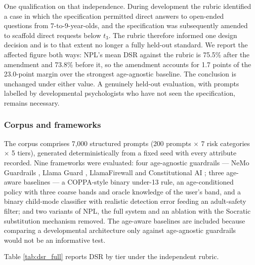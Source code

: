 \documentclass[fleqn,10pt]{wlscirep}
\begin{document}
One qualification on that independence. During development the rubric identified a case in which the specification permitted direct answers to open-ended questions from 7-to-9-year-olds, and the specification was subsequently amended to scaffold direct requests below $t_3$. The rubric therefore informed one design decision and is to that extent no longer a fully held-out standard. We report the affected figure both ways: NPL's mean DSR against the rubric is 75.5\% after the amendment and 73.8\% before it, so the amendment accounts for 1.7 points of the 23.0-point margin over the strongest age-agnostic baseline. The conclusion is unchanged under either value. A genuinely held-out evaluation, with prompts labelled by developmental psychologists who have not seen the specification, remains necessary.

\subsubsection*{Corpus and frameworks}

The corpus comprises 7,000 structured prompts (200 prompts $\times$ 7 risk categories $\times$ 5 tiers), generated deterministically from a fixed seed with every attribute recorded. Nine frameworks were evaluated: four age-agnostic guardrails --- NeMo Guardrails \cite{Rebedea2023}, Llama Guard \cite{Inan2023}, LlamaFirewall \cite{MetaAI2025} and Constitutional AI \cite{Bai2022}; three age-aware baselines --- a COPPA-style binary under-13 rule, an age-conditioned policy with three coarse bands and oracle knowledge of the user's band, and a binary child-mode classifier with realistic detection error feeding an adult-safety filter; and two variants of NPL, the full system and an ablation with the Socratic substitution mechanism removed. The age-aware baselines are included because comparing a developmental architecture only against age-agnostic guardrails would not be an informative test.

Table \ref{tab:dsr_full} reports DSR by tier under the independent rubric.
\end{document}
